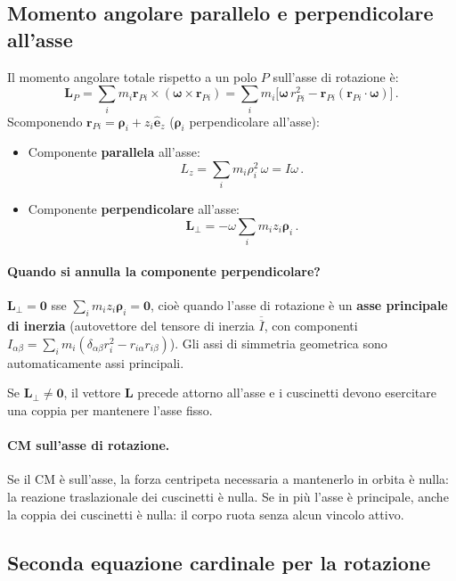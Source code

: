 \documentclass[11pt,a4paper]{article}
\renewcommand{\vec}[1]{\bm{#1}}
\newcommand{\ez}{\hat{\bm{e}}_z}
\newcommand{\om}{\vec{\omega}}
\theoremstyle{plain}
\theoremstyle{definition}
\theoremstyle{remark}
\begin{document}
\subsection{Momento angolare parallelo e perpendicolare all'asse}

Il momento angolare totale rispetto a un polo $P$ sull'asse di rotazione è:
\[
  \vec{L}_P=\sum_i m_i\vec{r}_{Pi}\times(\om\times\vec{r}_{Pi})
           =\sum_i m_i\bigl[\om\,r_{Pi}^2-\vec{r}_{Pi}(\vec{r}_{Pi}\cdot\om)\bigr]\,.
\]
Scomponendo $\vec{r}_{Pi}=\vec{\rho}_i+z_i\ez$ ($\vec{\rho}_i$ perpendicolare
all'asse):

\begin{itemize}
  \item Componente \textbf{parallela} all'asse:
    \[L_z=\sum_i m_i\rho_i^2\,\omega=I\omega\,.\]
  \item Componente \textbf{perpendicolare} all'asse:
    \[
      \vec{L}_\perp=-\omega\sum_i m_i z_i\vec{\rho}_i\,.
    \]
\end{itemize}

\paragraph{Quando si annulla la componente perpendicolare?}
$\vec{L}_\perp=\vec{0}$ sse $\sum_i m_i z_i\vec{\rho}_i=\vec{0}$, cioè
quando l'asse di rotazione è un \textbf{asse principale di inerzia} (autovettore
del tensore di inerzia $\overline{\overline{I}}$, con componenti
$I_{\alpha\beta}=\sum_i m_i(\delta_{\alpha\beta}r_i^2-r_{i\alpha}r_{i\beta})$).
Gli assi di simmetria geometrica sono automaticamente assi principali.

Se $\vec{L}_\perp\neq\vec{0}$, il vettore $\vec{L}$ precede attorno all'asse
e i cuscinetti devono esercitare una coppia per mantenere l'asse fisso.

\paragraph{CM sull'asse di rotazione.}
Se il CM è sull'asse, la forza centripeta necessaria a mantenerlo in orbita è
nulla: la reazione traslazionale dei cuscinetti è nulla. Se in più l'asse è
principale, anche la coppia dei cuscinetti è nulla: il corpo ruota senza
alcun vincolo attivo.

\subsection{Seconda equazione cardinale per la rotazione}
\end{document}
